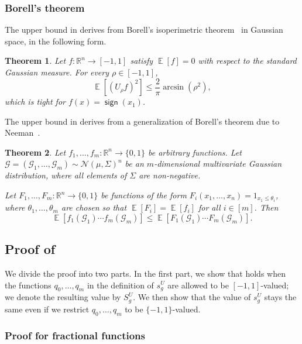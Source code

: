 \documentclass{article}
\newtheorem{theorem}{Theorem}[section]
\theoremstyle{definition}
\theoremstyle{remark}
\DeclareMathOperator*{\E}{\mathbb{E}}
\providecommand{\normal}{\mathcal{N}}
\DeclareMathOperator{\sgn}{\mathsf{sign}}
\renewcommand\leq{\leqslant}
\begin{document}
\subsubsection{Borell's theorem}

The upper bound in  derives from Borell's isoperimetric theorem~\cite{Borell} in Gaussian space, in the following form.

\begin{theorem} \label{thm:borell}
Let $f\colon \mathbb{R}^n \to [-1,1]$ satisfy $\E[f] = 0$ with respect to the standard Gaussian measure. For every $\rho \in [-1,1]$,
\[
 \E[(U_\rho f)^2] \leq \frac{2}{\pi} \arcsin (\rho^2),
\]
which is tight for $f(x) = \sgn(x_1)$.
\end{theorem}

The upper bound in  derives from a generalization of Borell's theorem due to Neeman~\cite{Neeman}.

\begin{theorem} \label{thm:neeman}
Let $f_1,\ldots,f_m\colon \mathbb{R}^n \to \{0,1\}$ be arbitrary functions. Let $\mathcal{G} = (\mathcal{G}_1,\ldots,\mathcal{G}_m) \sim \normal(\mu,\Sigma)^n$ be an $m$-dimensional multivariate Gaussian distribution, where all elements of $\Sigma$ are non-negative.

Let $F_1,\ldots,F_m\colon \mathbb{R}^n \to \{0,1\}$ be functions of the form $F_i(x_1,\ldots,x_n) = 1_{x_1 \leq \theta_i}$, where $\theta_1,\ldots,\theta_m$ are chosen so that $\E[F_i] = \E[f_i]$ for all $i \in [m]$. Then
\[
 \E[f_1(\mathcal{G}_1) \cdots f_m(\mathcal{G}_m)] \leq
 \E[F_1(\mathcal{G}_1) \cdots F_m(\mathcal{G}_m)].
\]
\end{theorem}

\subsection{Proof of } 

We divide the proof into two parts. In the first part, we show that  holds when the functions $q_0,\ldots,q_m$ in the definition of $s_g^U$ are allowed to be $[-1,1]$-valued; we denote the resulting value by $S_g^U$. We then show that the value of $s_g^U$ stays the same even if we restrict $q_0,\ldots,q_m$ to be $\{-1,1\}$-valued.

\subsubsection{Proof for fractional functions}
\end{document}
